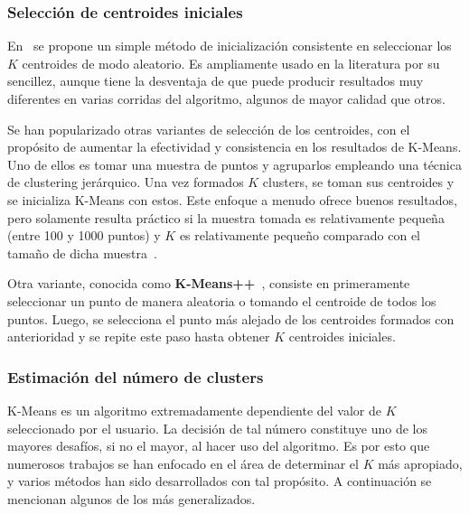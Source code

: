 \subsubsection{Selección de centroides iniciales}

En~\cite{MacQueen67} se propone un simple método de inicialización consistente en seleccionar los $K$ centroides de modo aleatorio.
Es ampliamente usado en la literatura por su sencillez, aunque tiene la desventaja de que puede producir resultados muy diferentes en varias corridas del algoritmo, algunos de mayor calidad que otros.

Se han popularizado otras variantes de selección de los centroides, con el propósito de aumentar la efectividad y consistencia en los resultados de K-Means.
Uno de ellos es tomar una muestra de puntos y agruparlos empleando una técnica de clustering jerárquico.
Una vez formados $K$ clusters, se toman sus centroides y se inicializa K-Means con estos.
Este enfoque a menudo ofrece buenos resultados, pero solamente resulta práctico si la muestra tomada es relativamente pequeña (entre 100 y 1000 puntos) y $K$ es relativamente pequeño comparado con el tamaño de dicha muestra~\cite{Tan05}.

Otra variante, conocida como \textbf{K-Means++}~\cite{Arthur07}, consiste en primeramente seleccionar un punto de manera aleatoria o tomando el centroide de todos los puntos.
Luego, se selecciona el punto más alejado de los centroides formados con anterioridad y se repite este paso hasta obtener $K$ centroides iniciales.

\subsubsection{Estimación del número de clusters}

K-Means es un algoritmo extremadamente dependiente del valor de $K$ seleccionado por el usuario.
La decisión de tal número constituye uno de los mayores desafíos, si no el mayor, al hacer uso del algoritmo.
Es por esto que numerosos trabajos se han enfocado en el área de determinar el $K$ más apropiado, y varios métodos han sido desarrollados con tal propósito.
A continuación se mencionan algunos de los más generalizados.

